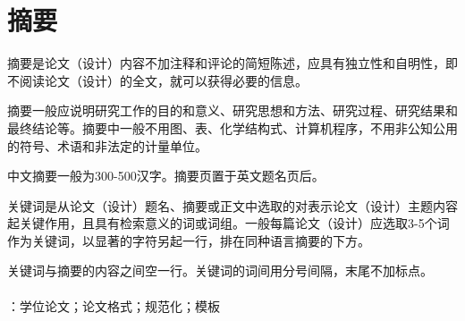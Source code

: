 

\section*{摘\quad 要}

\thesisbodyfont
摘要是论文（设计）内容不加注释和评论的简短陈述，应具有独立性和自明性，即不阅读论文（设计）的全文，就可以获得必要的信息。\par
摘要一般应说明研究工作的目的和意义、研究思想和方法、研究过程、研究结果和最终结论等。摘要中一般不用图、表、化学结构式、计算机程序，不用非公知公用的符号、术语和非法定的计量单位。\par
中文摘要一般为300-500汉字。摘要页置于英文题名页后。\par
关键词是从论文（设计）题名、摘要或正文中选取的对表示论文（设计）主题内容起关键作用，且具有检索意义的词或词组。一般每篇论文（设计）应选取3-5个词作为关键词，以显著的字符另起一行，排在同种语言摘要的下方。\par
关键词与摘要的内容之间空一行。关键词的词间用分号间隔，末尾不加标点。\\

~\\
：学位论文；论文格式；规范化；模板\\

